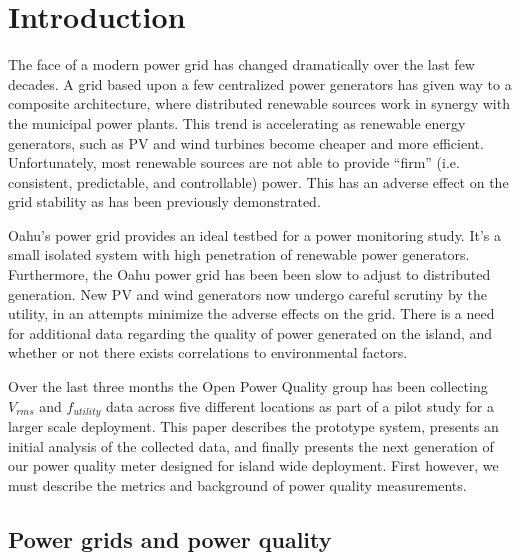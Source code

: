 
\section{Introduction}

The face of a modern power grid has changed dramatically over the last few decades. A grid based upon a few centralized power generators has given way to a composite architecture, where distributed renewable sources work in synergy with the municipal power plants. This trend is accelerating as renewable energy generators, such as PV and wind  turbines become cheaper and more efficient. Unfortunately, most renewable sources are not able to provide ``firm'' (i.e. consistent, predictable, and controllable)  power. This has an adverse effect on the grid stability as has been previously demonstrated.\cite{pq_effect1}\cite{pq_effect2}

Oahu's power grid provides an ideal testbed for a power monitoring study. It's a small isolated system with high penetration of renewable power generators. Furthermore, the Oahu power grid has been been slow to adjust to distributed generation. New PV and wind generators now undergo careful scrutiny by the utility, in an attempts minimize the adverse effects on the grid. There is a need for additional data regarding the quality of power generated on the island, and whether or not there exists correlations  to environmental factors.

Over the last three months the Open Power Quality group has been collecting $V_{rms}$ and $f_{utility}$ data across five different locations as part of a pilot study for a larger scale deployment. This paper describes the prototype system, presents an initial analysis of the collected data, and finally presents the next generation of our power quality meter designed for island wide deployment. First however, we must describe the metrics and background of power quality measurements.

\subsection{Power grids and power quality}

